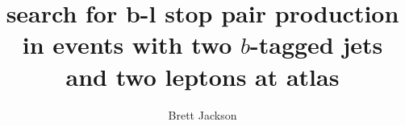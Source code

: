 \title{search for b-l stop pair production in events with two $b$-tagged
       jets and two leptons at atlas}
    
\author{Brett Jackson}

\newcommand{\adviser}{Evelyn Thomson, Associate Professor, Physics}
\newcommand{\advisershort}{Evelyn Thomson}

\newcommand{\myinstitution}{The University of Pennsylvania}

\newcommand{\chairperson}{Marija Drndic, Professor, Physics}

\newcommand{\committeeOne}{I. Joseph Kroll, Professor, Physics}
\newcommand{\committeeTwo}{H.H. Williams, Professor, Physics}
\newcommand{\committeeThree}{Burt Ovrut, Professor, Physics}
\newcommand{\committeeFour}{--}



